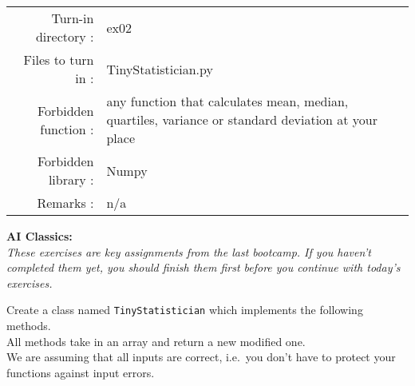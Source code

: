 \documentclass[]{article}
\begin{document}
\begin{longtable}[]{@{}rl@{}}
\toprule
\endhead
\begin{minipage}[t]{0.54\columnwidth}\raggedleft
Turn-in directory :\strut
\end{minipage} & \begin{minipage}[t]{0.40\columnwidth}\raggedright
ex02\strut
\end{minipage}\tabularnewline
\begin{minipage}[t]{0.54\columnwidth}\raggedleft
Files to turn in :\strut
\end{minipage} & \begin{minipage}[t]{0.40\columnwidth}\raggedright
TinyStatistician.py\strut
\end{minipage}\tabularnewline
\begin{minipage}[t]{0.54\columnwidth}\raggedleft
Forbidden function :\strut
\end{minipage} & \begin{minipage}[t]{0.40\columnwidth}\raggedright
any function that calculates mean, median, quartiles, variance or
standard deviation at your place\strut
\end{minipage}\tabularnewline
\begin{minipage}[t]{0.54\columnwidth}\raggedleft
Forbidden library :\strut
\end{minipage} & \begin{minipage}[t]{0.40\columnwidth}\raggedright
Numpy\strut
\end{minipage}\tabularnewline
\begin{minipage}[t]{0.54\columnwidth}\raggedleft
Remarks :\strut
\end{minipage} & \begin{minipage}[t]{0.40\columnwidth}\raggedright
n/a\strut
\end{minipage}\tabularnewline
\bottomrule
\end{longtable}

\textbf{AI Classics:}\\
\emph{These exercises are key assignments from the last bootcamp. If you
haven't completed them yet, you should finish them first before you
continue with today's exercises.}

Create a class named \texttt{TinyStatistician} which implements the
following methods.\\
All methods take in an array and return a new modified one.\\
We are assuming that all inputs are correct, i.e.~you don't have to
protect your functions against input errors.
\end{document}

